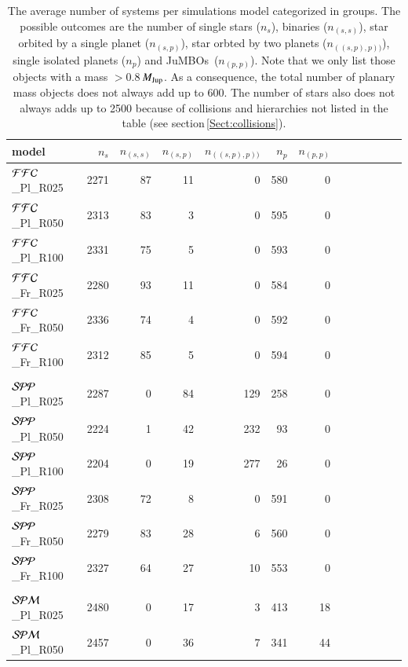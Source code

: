 \documentclass[submission,phys]{lib/SciPost}
\newcommand{\MJup}{\mbox{${M}_{\rm Jup}$}}
\newcommand{\jumbos}{\mbox{JuMBOs}}
\begin{document}
\begin{table}
  \caption{The average number of systems per simulations model
    categorized in groups.  The possible outcomes are the number of
    single stars ($n_{s}$), binaries ($n_{(s,s)}$), star orbited by a
    single planet ($n_{(s,p)}$), star orbted by two planets
    ($n_{((s,p),p))}$), single isolated planets ($n_{p}$) and
    \jumbos\, ($n_{(p,p)}$).  Note that we only list those objects
    with a mass $>0.8$\,\MJup.  As a consequence, the total number of
    planary mass objects does not always add up to 600.  The number of
    stars also does not always adds up to 2500 because of collisions
    and hierarchies not listed in the table (see
    section\,\ref{Sect:collisions}).}
 \label{Tab:model_numbers}
 \centering 
 \begin{tabular}{lrrrrrrrrrrrr}
   \hline\hline
   model & $n_{s}$ & $n_{(s,s)}$ & $n_{(s,p)}$ & $n_{((s,p),p))}$ & $n_{p}$ & $n_{(p,p)}$ \\
  \hline
${\cal FFC}$\_Pl\_R025 &  2271 & 87 & 11 & 0 & 580 & 0 \\
${\cal FFC}$\_Pl\_R050 &  2313 & 83 &  3 & 0 & 595 & 0 \\
${\cal FFC}$\_Pl\_R100 &  2331 & 75 &  5 & 0 & 593 & 0 \\
${\cal FFC}$\_Fr\_R025 &  2280 & 93 & 11 & 0 & 584 & 0 \\
${\cal FFC}$\_Fr\_R050 &  2336 & 74 &  4 & 0 & 592 & 0 \\
${\cal FFC}$\_Fr\_R100 &  2312 & 85 &  5 & 0 & 594 & 0 \\
  \hline
  \hline \vspace{-0.75em}\\
${\cal SPP}$\_Pl\_R025 &  2287 &  0 & 84 & 129 & 258 & 0 \\
${\cal SPP}$\_Pl\_R050 &  2224 &  1 & 42 & 232 &  93 & 0 \\
${\cal SPP}$\_Pl\_R100 &  2204 &  0 & 19 & 277 &  26 & 0 \\
${\cal SPP}$\_Fr\_R025 &  2308 & 72 &  8 &   0 & 591 & 0 \\  
${\cal SPP}$\_Fr\_R050 &  2279 & 83 & 28 &   6 & 560 & 0 \\ 
${\cal SPP}$\_Fr\_R100 &  2327 & 64 & 27 &  10 & 553 & 0 \\
  \hline
  \hline \vspace{-0.75em}\\
${\cal SPM}$\_Pl\_R025 &  2480 &  0 & 17 &  3 & 413 & 18 \\
${\cal SPM}$\_Pl\_R050 &  2457 &  0 & 36 &  7 & 341 & 44 \\

\end{tabular}
\end{table}
\end{document}
